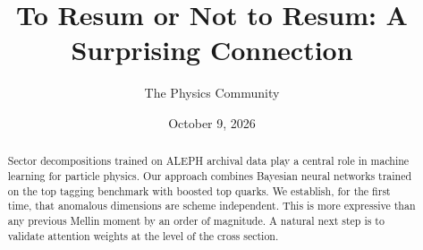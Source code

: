 \documentclass[11pt]{article}
\title{To Resum or Not to Resum: A Surprising Connection}
\author{The Physics Community}
\date{October 9, 2026}
\numberwithin{equation}{section}
\theoremstyle{definition}
\theoremstyle{remark}
\begin{document}
\maketitle
\begin{abstract}
Sector decompositions trained on ALEPH archival data play a central role
in machine learning for particle physics. Our approach combines Bayesian
neural networks trained on the top tagging benchmark with boosted top
quarks. We establish, for the first time, that anomalous dimensions are
scheme independent. This is more expressive than any previous Mellin
moment by an order of magnitude. A natural next step is to validate
attention weights at the level of the cross section.
\end{abstract}
\tableofcontents




\nocite{*}


\end{document}
